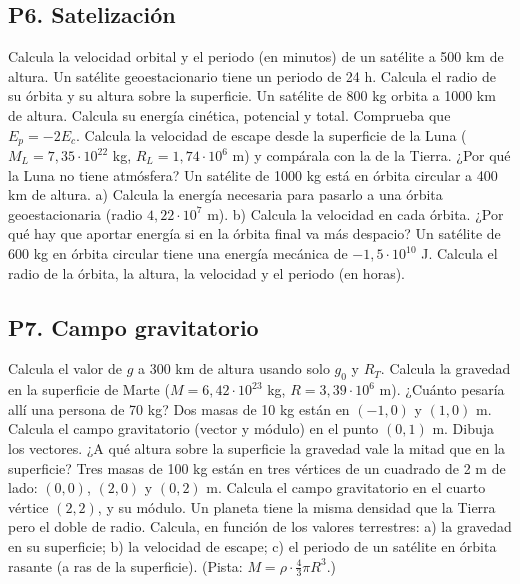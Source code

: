\documentclass[11pt,a4paper]{article}
\begin{document}
\subsection*{P6. Satelización}
\begin{enumerate}[leftmargin=1.4cm,itemsep=5pt]
 Calcula la velocidad orbital y el periodo (en minutos) de un satélite a 500 km de altura.
 Un satélite geoestacionario tiene un periodo de 24 h. Calcula el radio de su órbita y su altura sobre la superficie.
 Un satélite de 800 kg orbita a 1000 km de altura. Calcula su energía cinética, potencial y total. Comprueba que $E_p=-2E_c$.
 Calcula la velocidad de escape desde la superficie de la Luna ($M_L=7{,}35\cdot10^{22}$ kg, $R_L=1{,}74\cdot10^6$ m) y compárala con la de la Tierra. ¿Por qué la Luna no tiene atmósfera?
 Un satélite de 1000 kg está en órbita circular a 400 km de altura. a) Calcula la energía necesaria para pasarlo a una órbita geoestacionaria (radio $4{,}22\cdot10^7$ m). b) Calcula la velocidad en cada órbita. ¿Por qué hay que aportar energía si en la órbita final va más despacio?
 Un satélite de 600 kg en órbita circular tiene una energía mecánica de $-1{,}5\cdot10^{10}$ J. Calcula el radio de la órbita, la altura, la velocidad y el periodo (en horas).
\end{enumerate}

\subsection*{P7. Campo gravitatorio}
\begin{enumerate}[leftmargin=1.4cm,itemsep=5pt]
 Calcula el valor de $g$ a 300 km de altura usando solo $g_0$ y $R_T$.
 Calcula la gravedad en la superficie de Marte ($M=6{,}42\cdot10^{23}$ kg, $R=3{,}39\cdot10^6$ m). ¿Cuánto pesaría allí una persona de 70 kg?
 Dos masas de 10 kg están en $(-1,0)$ y $(1,0)$ m. Calcula el campo gravitatorio (vector y módulo) en el punto $(0,1)$ m. Dibuja los vectores.
 ¿A qué altura sobre la superficie la gravedad vale la mitad que en la superficie?
 Tres masas de 100 kg están en tres vértices de un cuadrado de 2 m de lado: $(0,0)$, $(2,0)$ y $(0,2)$ m. Calcula el campo gravitatorio en el cuarto vértice $(2,2)$, y su módulo.
 Un planeta tiene la misma densidad que la Tierra pero el doble de radio. Calcula, en función de los valores terrestres: a) la gravedad en su superficie; b) la velocidad de escape; c) el periodo de un satélite en órbita rasante (a ras de la superficie). (Pista: $M=\rho\cdot\frac43\pi R^3$.)
\end{enumerate}
\end{document}
